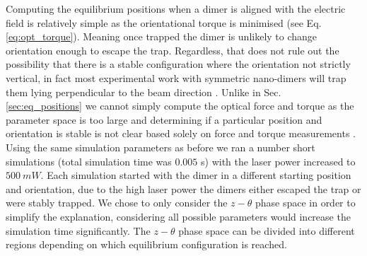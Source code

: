 Computing the equilibrium positions when a dimer is 
aligned with the electric field is relatively simple 
as the orientational torque is minimised (see Eq.
\ref{eq:opt_torque}). Meaning once trapped the 
dimer is unlikely to change orientation enough to 
escape the trap. Regardless, that does not rule out 
the possibility that there is a stable configuration 
where the orientation not strictly vertical, in fact 
most experimental work with symmetric nano-dimers will 
trap them lying perpendicular to the beam direction 
\cite{Ahn2018, Reimann2018}. Unlike in Sec.~
\ref{sec:eq_positions} we cannot simply compute the 
optical force and torque as the parameter space is too 
large and determining if a particular position and 
orientation is stable is not clear based solely on 
force and torque measurements \cite{Bui2017}. Using 
the same simulation parameters as before we ran a 
number short simulations (total simulation time was 
$0.005$ s) with the laser power increased to $500\ mW$. 
Each simulation started with the dimer in a different 
starting position and orientation, due to the high 
laser power the dimers either escaped the trap or 
were stably trapped. We chose to only consider the $z-
\theta$ phase space in order to simplify the explanation,
considering all possible parameters would increase the 
simulation time significantly. The $z-\theta$ phase space 
can be divided into different regions depending on which 
equilibrium configuration is reached.
